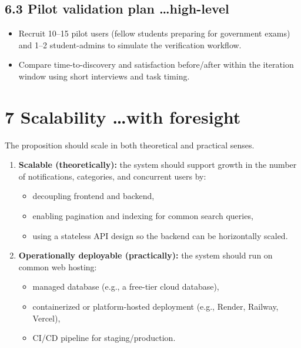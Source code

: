 \documentclass[11pt,a4paper]{article}
\begin{document}
\subsection*{6.3 Pilot validation plan \dots high-level}
\begin{itemize}[leftmargin=1.5em]
  \item Recruit 10--15 pilot users (fellow students preparing for government
  exams) and 1--2 student-admins to simulate the verification workflow.
  \item Compare time-to-discovery and satisfaction before/after within the
  iteration window using short interviews and task timing.
\end{itemize}

\section*{7 Scalability \dots with foresight}
The proposition should scale in both theoretical and practical senses.
\begin{enumerate}[leftmargin=1.5em]
  \item \textbf{Scalable (theoretically):} the system should support growth in
  the number of notifications, categories, and concurrent users by:
  \begin{itemize}
    \item decoupling frontend and backend,
    \item enabling pagination and indexing for common search queries,
    \item using a stateless API design so the backend can be horizontally
    scaled.
  \end{itemize}
  \item \textbf{Operationally deployable (practically):} the system should run
  on common web hosting:
  \begin{itemize}
    \item managed database (e.g., a free-tier cloud database),
    \item containerized or platform-hosted deployment (e.g., Render, Railway,
    Vercel),
    \item CI/CD pipeline for staging/production.
  \end{itemize}
\end{enumerate}
\end{document}

